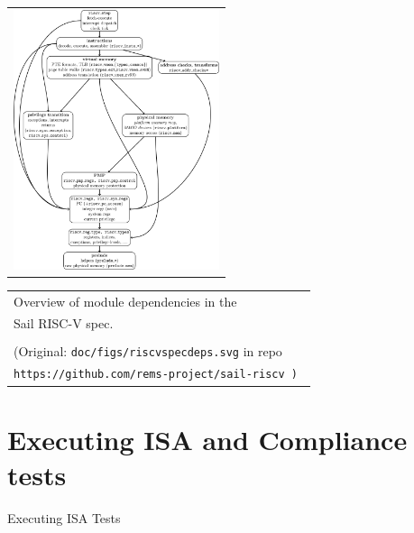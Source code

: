 \documentclass[aspectratio=169]{beamer}
\newcommand{\hm}{\hspace*{1em}}
\newcommand{\hmmm}{\hspace*{3em}}
\newcommand{\slidefont}{\scriptsize}
\begin{document}
\begin{frame}[fragile]

  \slidefont

  \begin{tabular}[c]{l}
    \includegraphics[height=3in]{Figures/riscvspecdeps.png}
  \end{tabular}
  \hmmm
  \begin{tabular}[c]{l}
    Overview of module dependencies in the \\
    Sail RISC-V spec. \\
    \\
    \tiny (Original: {\tt doc/figs/riscvspecdeps.svg} in repo \\
    \hm\tiny\tt https://github.com/rems-project/sail-riscv )
  \end{tabular}

\end{frame}


\section{Executing ISA and Compliance tests}


\begin{frame}

  \slidefont

  \vfill

  \begin{center}\LARGE
    Executing ISA Tests
  \end{center}

  \vfill

\end{frame}
\end{document}
